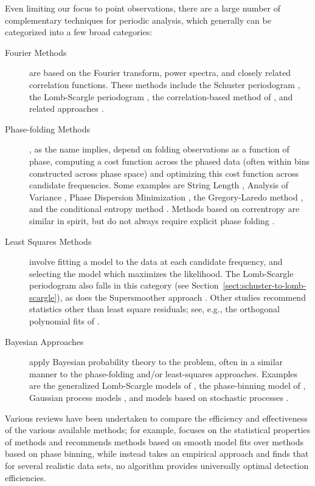 \documentclass[preprint]{aastex}
\newcommand{\Sect}[1]{Section~\ref{sect:#1}}
\newcommand{\sect}[1]{\Sect{#1}}
\begin{document}
Even limiting our focus to point observations, there are a large number of
complementary techniques for periodic analysis, which generally can be
categorized into a few broad categories:
\begin{description}
  \item[Fourier Methods] are based on the Fourier transform, power spectra,
    and closely related correlation functions. These methods include the
    Schuster periodogram \citep{Schuster98}, the Lomb-Scargle periodogram
    \citep{Lomb76, Scargle82}, the correlation-based method of
    \citet{Edelson88}, and related approaches
    \citep[see also][who discusses wavelet transforms in this
      context]{Foster96}.
  \item[Phase-folding Methods], as the name implies, depend on folding
    observations as a function of phase, computing a cost function across
    the phased data (often within bins constructed across phase space)
    and optimizing this cost function across candidate frequencies.
    Some examples are
    String Length \citep{Dworetsky83},
    Analysis of Variance \citep{Schwarzenberg-Czerny89},
    Phase Dispersion Minimization \citep{Stellingwerf78},
    the Gregory-Laredo method \citep{Gregory92},
    and the conditional entropy method \citep{Graham2013}.
    Methods based on correntropy are similar in spirit, but do not always
    require explicit phase folding \citep{Huijse2011,Huijse2012}.
  \item[Least Squares Methods] involve fitting a model to the data at each
    candidate frequency, and selecting the model which maximizes the likelihood.
    The Lomb-Scargle periodogram also falls in this category
    (see \sect{schuster-to-lomb-scargle}), as does the Supersmoother approach
    \citep{Reimann94}. Other studies recommend statistics other than
    least square residuals; see, e.g., the orthogonal polynomial fits of
    \citet{Schwarzenberg-Czerny96}.
  \item[Bayesian Approaches] apply Bayesian probability theory to the problem,
    often in a similar manner to the phase-folding and/or least-squares
    approaches.
    Examples are the generalized Lomb-Scargle models of \citet{Bretthorst88},
    the phase-binning model of \citet{Gregory92}, Gaussian process models
    \citep[e.g.][]{Wang2012}, and models based on stochastic processes
    \citep[e.g.][]{Kelly14}.
\end{description}
Various reviews have been undertaken to compare the efficiency and effectiveness
of the various available methods; for example, \citet{Schwarzenberg-Czerny99}
focuses on the statistical properties of methods and recommends methods
based on smooth model fits over methods based on phase binning,
while \citet{Graham2013b} instead takes an empirical approach and finds that
for several realistic data sets, no algorithm provides universally optimal
detection efficiencies.
\end{document}
